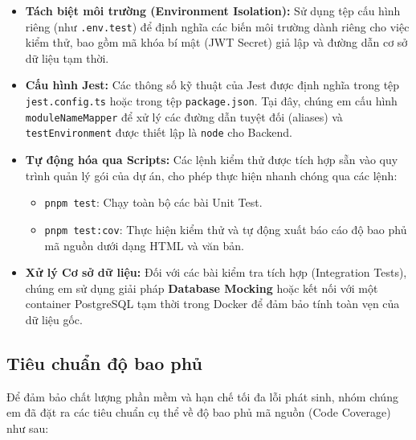 \begin{itemize}
    \item \textbf{Tách biệt môi trường (Environment Isolation):} Sử dụng tệp cấu hình riêng (như \texttt{.env.test}) để định nghĩa các biến môi trường dành riêng cho việc kiểm thử, bao gồm mã khóa bí mật (JWT Secret) giả lập và đường dẫn cơ sở dữ liệu tạm thời.
    \item \textbf{Cấu hình Jest:} Các thông số kỹ thuật của Jest được định nghĩa trong tệp \texttt{jest.config.ts} hoặc trong tệp \texttt{package.json}. Tại đây, chúng em cấu hình \texttt{moduleNameMapper} để xử lý các đường dẫn tuyệt đối (aliases) và \texttt{testEnvironment} được thiết lập là \texttt{node} cho Backend.
    \item \textbf{Tự động hóa qua Scripts:} Các lệnh kiểm thử được tích hợp sẵn vào quy trình quản lý gói của dự án, cho phép thực hiện nhanh chóng qua các lệnh:
    \begin{itemize}
        \item \texttt{pnpm test}: Chạy toàn bộ các bài Unit Test.
        \item \texttt{pnpm test:cov}: Thực hiện kiểm thử và tự động xuất báo cáo độ bao phủ mã nguồn dưới dạng HTML và văn bản.
    \end{itemize}
    \item \textbf{Xử lý Cơ sở dữ liệu:} Đối với các bài kiểm tra tích hợp (Integration Tests), chúng em sử dụng giải pháp \textbf{Database Mocking} hoặc kết nối với một container PostgreSQL tạm thời trong Docker để đảm bảo tính toàn vẹn của dữ liệu gốc.
\end{itemize}


\subsection{Tiêu chuẩn độ bao phủ}
Để đảm bảo chất lượng phần mềm và hạn chế tối đa lỗi phát sinh, nhóm chúng em đã đặt ra các tiêu chuẩn cụ thể về độ bao phủ mã nguồn (Code Coverage) như sau:

